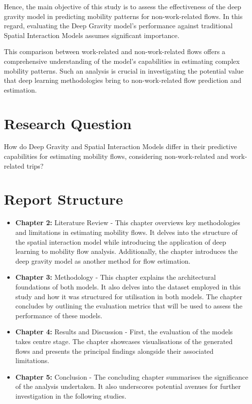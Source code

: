    Hence, the main objective of this study is to assess the effectiveness of the deep gravity model in predicting mobility patterns for non-work-related flows. In this regard, evaluating the Deep Gravity model's performance against traditional Spatial Interaction Models assumes significant importance. 

    This comparison between work-related and non-work-related flows offers a comprehensive understanding of the model's capabilities in estimating complex mobility patterns. Such an analysis is crucial in investigating the potential value that deep learning methodologies bring to non-work-related flow prediction and estimation.


    \section{Research Question}    

    How do Deep Gravity and Spatial Interaction Models differ in their predictive capabilities for estimating mobility flows, considering non-work-related and work-related trips?

   

    \section{Report Structure}

    \begin{itemize}
        \item \textbf{Chapter 2:} Literature Review - This chapter overviews key methodologies and limitations in estimating mobility flows. It delves into the structure of the spatial interaction model while introducing the application of deep learning to mobility flow analysis. Additionally, the chapter introduces the deep gravity model as another method for flow estimation. 
        \item \textbf{Chapter 3:} Methodology - This chapter explains the architectural foundations of both models. It also delves into the dataset employed in this study and how it was structured for utilisation in both models. The chapter concludes by outlining the evaluation metrics that will be used to assess the performance of these models.
        \item \textbf{Chapter 4:} Results and Discussion - First, the evaluation of the models takes centre stage. The chapter showcases visualisations of the generated flows and presents the principal findings alongside their associated limitations.
        \item \textbf{Chapter 5:} Conclusion - The concluding chapter summarises the significance of the analysis undertaken. It also underscores potential avenues for further investigation in the following studies.  
    \end{itemize}






